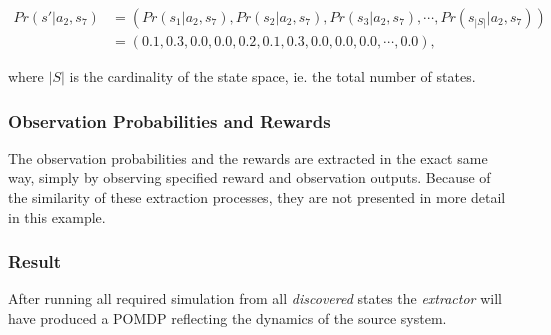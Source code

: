 \begin{align}
Pr(s'|a_2,s_7) & = (Pr(s_1|a_2,s_7),Pr(s_2|a_2,s_7),Pr(s_3|a_2,s_7),\cdots,Pr(s_{|S|}|a_2,s_7)) \nonumber \\
&= (0.1,0.3,0.0,0.0,0.2,0.1,0.3,0.0,0.0,0.0,\cdots,0.0), \nonumber
\end{align}

where $|S|$ is the cardinality of the state space, ie. the total number of states.

\subsubsection{Observation Probabilities and Rewards}

The observation probabilities and the rewards are extracted in the exact same way, simply by observing specified reward and observation outputs. Because of the similarity of these extraction processes, they are not presented in more detail in this example.

\subsubsection{Result}

After running all required simulation from all \textit{discovered} states the \textit{extractor} will have produced a POMDP reflecting the dynamics of the source system.


